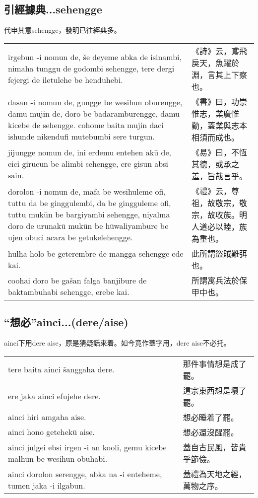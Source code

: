 \documentclass{article}
\begin{document}
\subsection{引經據典...sehengge}
\noindent 代申其意sehengge，發明已往經典多。
\begin{center}
    \begin{tabularx}{\textwidth}{XX}
        irgebun -i nomun de, \v{s}e deyeme abka de isinambi, nimaha tunggu de godombi sehengge, tere dergi fejergi de iletulehe be henduhebi. & 《詩》云，鳶飛戾天，魚躍於淵，言其上下察也。\\
        dasan -i nomun de, gungge be wesihun oburengge, damu mujin de, doro be badaramburengge, damu kicebe de sehengge. cohome baita mujin daci ishunde nikendufi mutebumbi sere turgun. & 《書》曰，功崇惟志，業廣惟勤，蓋業與志本相須而成也。\\
        jijungge nomun de, ini erdemu entehen ak\={u} de, eici girucun be alimbi sehengge, ere gisun absi sain.& 《易》曰，不恆其德，或承之羞，旨哉言乎。\\
        dorolon -i nomun de, mafa be wesihuleme ofi, tuttu da be ginggulembi, da be gingguleme ofi, tuttu muk\={u}n be bargiyambi sehengge, niyalma doro de urunak\={u} muk\={u}n be h\={u}waliyambure be ujen obuci acara be getukelehengge. & 《禮》云，尊祖，故敬宗，敬宗，故收族。明人道必以睦，族為重也。\\
        h\={u}lha holo be geterembre de mangga sehengge ede kai. & 此所謂盜賊難弭也。 \\
        coohai doro be ga\v{s}an falga banjibure de baktambuhabi sehengge, erebe kai. & 所謂寓兵法於保甲中也。
    \end{tabularx}
\end{center}

\subsection{“想必”ainci...(dere/aise)}
\noindent ainci下用dere aise，原是猜疑話來着。如今竟作蓋字用，dere aise不必托。
\begin{center}
    \begin{tabularx}{\textwidth}{XX}
        tere baita ainci \v{s}anggaha dere. & 那件事情想是成了罷。\\
        ere jaka ainci efujehe dere. & 這宗東西想是壞了罷。\\
        ainci hiri amgaha aise. & 想必睡着了罷。\\
        ainci hono getehek\={u} aise. & 想必還沒醒罷。\\
        ainci julgei ebsi irgen -i an kooli, gemu kicebe malh\={u}n be wesihun obuhabi. & 蓋自古民風，皆貴乎節儉。\\
        ainci dorolon serengge, abka na -i enteheme, tumen jaka -i ilgabun. & 蓋禮為天地之經，萬物之序。
    \end{tabularx}
\end{center}
\end{document}
